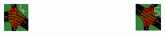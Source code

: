 \documentclass[dvipsnames]{beamer}
\begin{document}
\begin{frame}
\begin{columns}
\begin{column}{0.3\textwidth}
\begin{figure}
      \end{figure}
    \end{column}
  \end{columns}
  \begin{columns}
    \begin{column}{0.5\textwidth}
      \begin{figure}
        \centering
        \includegraphics[width=0.30\textwidth]{figures/sumo-rf-tls-4.png}
      \end{figure}
    \end{column}
    \begin{column}{0.5\textwidth}
      \begin{figure}
        \centering
        \includegraphics[width=0.30\textwidth]{figures/sumo-rf-tls-5.png}
      \end{figure}
    \end{column}
  \end{columns}
\end{frame}
\end{document}
